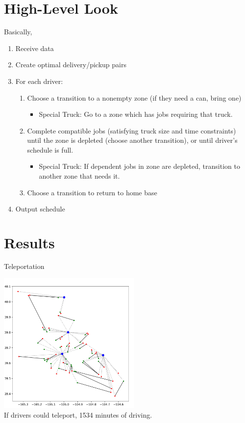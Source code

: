\documentclass{beamer}
\begin{document}
\section{High-Level Look}
\begin{frame}{Basically,}
\begin{enumerate}
	\item Receive data
\item Create optimal delivery/pickup pairs
\item For each driver:
	\begin{enumerate}
		\item Choose a transition to a nonempty zone (if they need a can, bring one)
			\begin{itemize}
				\item Special Truck: Go to a zone which has jobs requiring that truck.
			\end{itemize}
		\item Complete compatible jobs (satisfying truck size and time constraints) until the zone is depleted (choose another transition), or until driver's schedule is full.
			\begin{itemize}
				\item Special Truck: If dependent jobs in zone are depleted, transition to another zone that needs it.
			\end{itemize}
		\item Choose a transition to return to home base
	\end{enumerate}
\item Output schedule
\end{enumerate}
\end{frame}

\section{Results}
\begin{frame}{Teleportation}
	\begin{center}
	\includegraphics[width=7cm]{triangles.png}\\
	If drivers could teleport, 1534 minutes of driving.
	\end{center}
\end{frame}
\end{document}
